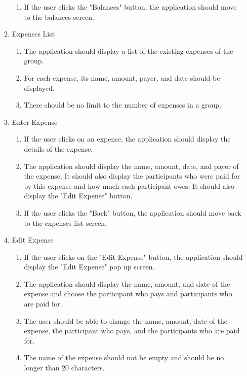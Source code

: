 \documentclass[conference]{IEEEtran}
\begin{document}
\begin{enumerate}
\begin{enumerate}
\begin{enumerate}
                        \item If the user clicks the "Balances" button, the application should move to the balances screen.
                    \end{enumerate}
                \item Expenses List
                    \begin{enumerate}
                        \item The application should display a list of the existing expenses of the group.
                        \item For each expense, its name, amount, payer, and date should be displayed.
                        \item There should be no limit to the number of expenses in a group.
                    \end{enumerate}
                \item Enter Expense
                    \begin{enumerate}
                        \item If the user clicks on an expense, the application should display the details of the expense.
                        \item The application should display the name, amount, date, and payer of the expense. It should also display the participants who were paid for by this expense and how much each participant owes. It should also display the "Edit Expense" button.
                        \item If the user clicks the "Back" button, the application should move back to the expenses list screen.
                    \end{enumerate}
                \item Edit Expense
                    \begin{enumerate}
                        \item If the user clicks on the "Edit Expense" button, the application should display the "Edit Expense" pop up screen.
                        \item The application should display the name, amount, and date of the expense and choose the participant who pays and participants who are paid for.
                        \item The user should be able to change the name, amount, date of the expense, the participant who pays, and the participants who are paid for.
                        \item The name of the expense should not be empty and should be no longer than 20 characters.

\end{enumerate}
\end{enumerate}
\end{enumerate}
\end{document}
